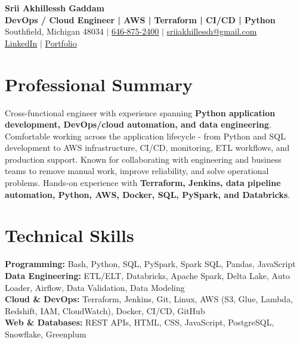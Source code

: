 \documentclass[letterpaper,10pt]{article}
\begin{document}
\fontsize{9.35pt}{10.45pt}\selectfont

\begin{center}
    {\LARGE \textbf{Srii Akhillessh Gaddam}} \\[-1pt]
    \textbf{DevOps / Cloud Engineer | AWS | Terraform | CI/CD | Python} \\[2pt]
    Southfield, Michigan 48034 $|$
    \href{tel:6468752400}{646-875-2400} $|$
    \href{mailto:sriiakhillessh@gmail.com}{sriiakhillessh@gmail.com} \\[1pt]
    \href{https://www.linkedin.com/in/srii-akhiilessh-gaddam-b48668191/}{LinkedIn} $|$
    \href{https://sriiakhillesshg.github.io/portfolio/}{Portfolio}
\end{center}
\vspace{-8pt}

\section{Professional Summary}
\small{Cross-functional engineer with experience spanning \textbf{Python application development, DevOps/cloud automation, and data engineering}. Comfortable working across the application lifecycle - from Python and SQL development to AWS infrastructure, CI/CD, monitoring, ETL workflows, and production support. Known for collaborating with engineering and business teams to remove manual work, improve reliability, and solve operational problems. Hands-on experience with \textbf{Terraform, Jenkins, data pipeline automation, Python, AWS, Docker, SQL, PySpark, and Databricks}.}

\section{Technical Skills}
\small{
\textbf{Programming:} Bash, Python, SQL, PySpark, Spark SQL, Pandas, JavaScript \\
\textbf{Data Engineering:} ETL/ELT, Databricks, Apache Spark, Delta Lake, Auto Loader, Airflow, Data Validation, Data Modeling \\
\textbf{Cloud \& DevOps:} Terraform, Jenkins, Git, Linux, AWS (S3, Glue, Lambda, Redshift, IAM, CloudWatch), Docker, CI/CD, GitHub \\
\textbf{Web \& Databases:} REST APIs, HTML, CSS, JavaScript, PostgreSQL, Snowflake, Greenplum
}
\end{document}
